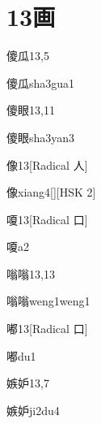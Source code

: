 
\section*{13画}

\begin{entry}{傻瓜}{13,5}
  \begin{phonetics}{傻瓜}{sha3gua1}
  \end{phonetics}
\end{entry}

\begin{entry}{傻眼}{13,11}
  \begin{phonetics}{傻眼}{sha3yan3}
  \end{phonetics}
\end{entry}

\begin{entry}{像}{13}[Radical 人]
  \begin{phonetics}{像}{xiang4}[][HSK 2]
  \end{phonetics}
\end{entry}

\begin{entry}{嗄}{13}[Radical 口]
  \begin{phonetics}{嗄}{a2}
  \end{phonetics}
\end{entry}

\begin{entry}{嗡嗡}{13,13}
  \begin{phonetics}{嗡嗡}{weng1weng1}
  \end{phonetics}
\end{entry}

\begin{entry}{嘟}{13}[Radical ⼝]
  \begin{phonetics}{嘟}{du1}
  \end{phonetics}
\end{entry}

\begin{entry}{嫉妒}{13,7}
  \begin{phonetics}{嫉妒}{ji2du4}
  \end{phonetics}
\end{entry}

